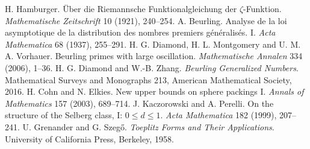 H. Hamburger. \"Uber die Riemannsche Funktionalgleichung der $\zeta$-Funktion. \emph{Mathematische Zeitschrift} 10 (1921), 240--254. %
 A. Beurling. Analyse de la loi asymptotique de la distribution des nombres premiers g\'en\'eralis\'es. I. \emph{Acta Mathematica} 68 (1937), 255--291. %
 H. G. Diamond, H. L. Montgomery and U. M. A. Vorhauer. Beurling primes with large oscillation. \emph{Mathematische Annalen} 334 (2006), 1--36. %
 H. G. Diamond and W.-B. Zhang. \emph{Beurling Generalized Numbers}. Mathematical Surveys and Monographs 213, American Mathematical Society, 2016. %
 H. Cohn and N. Elkies. New upper bounds on sphere packings I. \emph{Annals of Mathematics} 157 (2003), 689--714. %
 J. Kaczorowski and A. Perelli. On the structure of the Selberg class, I: $0\le d\le1$. \emph{Acta Mathematica} 182 (1999), 207--241. %
 U. Grenander and G. Szeg\H o. \emph{Toeplitz Forms and Their Applications}. University of California Press, Berkeley, 1958. %
